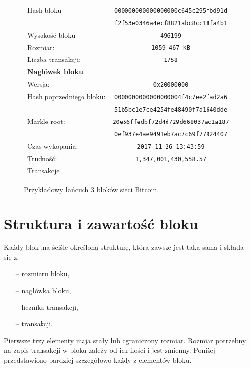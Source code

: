 \documentclass[12pt, twoside, final, openany]{mgr}
\begin{document}
\begin{figure}[H]
 	\begin{center}
	\begin{tabular}{ | l  c | }
		\hline   
     	Hash bloku &\texttt{000000000000000000c645c295fbd91d} \\
    			    & \texttt{f2f53e0346a4ecf8821abc8cc18fa4b1} \\ 
    	Wysokość bloku & \texttt{496199} \\ 
    	Rozmiar: & \texttt{1059.467 kB} \\
    	Liczba transakcji: & \texttt{1758} \\ \hline
		\textbf{Nagłówek bloku} & \\
		Wersja: & \texttt{0x20000000} \\
   	 	Hash poprzedniego bloku: & \texttt{0000000000000000004f4c7ee2fad2a6}\\
   	 							 & \texttt{51b5bc1e7ce4254fe48490f7a1640dde}\\
		Markle root: 			 & \texttt{20e56ffedbf72d4d729d668037ac1a187} \\
								 & \texttt{0ef937e4ae9491eb7ac7c69f77924407} \\
   		Czas wykopania: & \texttt{2017-11-26 13:43:59} \\
   		Trudność: & \texttt{1,347,001,430,558.57}\\
   		\hline
   		Transakcje &\\
   		\hline 
 	\end{tabular}
 	\end{center}
  	\caption{Przykładowy łańcuch 3 bloków sieci Bitcoin.}
	\label{fig:lancuchBlokow}
\end{figure}	

\section{Struktura i zawartość bloku}
\label{zawartoscBloku}
\indent Każdy blok ma ściśle określoną strukturę, która zawsze jest taka sama i składa się z:
\begin{itemize}
\item[--] rozmiaru bloku,
\item[--] nagłówka bloku,
\item[--] licznika transakcji,
\item[--] transakcji.
\end{itemize}

\indent Pierwsze trzy elementy maja stały lub ograniczony rozmiar. Rozmiar potrzebny na zapis transakcji w bloku zależy od ich ilości i jest zmienny. Poniżej przedstawiono bardziej szczegółowo każdy z elementów bloku. 
\end{document}
